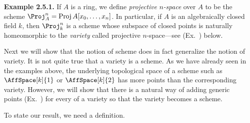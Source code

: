 {\medskip
\noindent\hypertarget{result-II-2.5.1}{}\textbf{Example 2.5.1.} If $A$ is a ring, we define \emph{projective $n$-space} over $A$ to be the scheme $\Proj_A^n=\operatorname{Proj}A[x_0,\ldots,x_n]$. In particular, if $A$ is an algebraically closed field $k$, then $\Proj_k^n$ is a scheme whose subspace of closed points is naturally homeomorphic to the \emph{variety} called projective $n$-space---see (Ex.~) below.

\medskip
Next we will show that the notion of scheme does in fact generalize the notion of variety. It is not quite true that a variety is a scheme. As we have already seen in the examples above, the underlying topological space of a scheme such as $\AffSpace[k]{1}$ or $\AffSpace[k]{2}$ has more points than the corresponding variety. However, we will show that there is a natural way of adding generic points (Ex.~) for every  of a variety so that the variety becomes a scheme.

To state our result, we need a definition.
}
